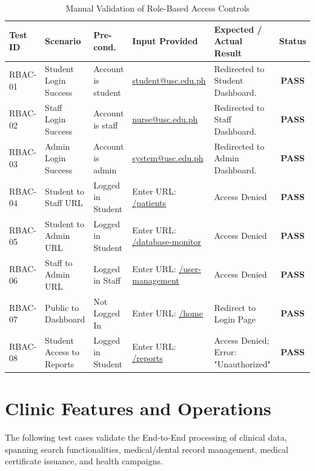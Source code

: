 \begin{table}[H]
\centering
\caption{Manual Validation of Role-Based Access Controls}
\begin{tabularx}{\textwidth}{|l|Y|Y|Y|Y|c|}
\hline
\textbf{Test ID} & \textbf{Scenario} & \textbf{Pre-cond.} & \textbf{Input Provided} & \textbf{Expected / Actual Result} & \textbf{Status} \\
\hline
RBAC-01 & Student Login Success & Account is student & \url{student@usc.edu.ph} & Redirected to Student Dashboard. & \textbf{PASS} \\
\hline
RBAC-02 & Staff Login Success & Account is staff & \url{nurse@usc.edu.ph} & Redirected to Staff Dashboard. & \textbf{PASS} \\
\hline
RBAC-03 & Admin Login Success & Account is admin & \url{system@usc.edu.ph} & Redirected to Admin Dashboard. & \textbf{PASS} \\
\hline
RBAC-04 & Student to Staff URL & Logged in Student & Enter URL: \url{/patients} & Access Denied & \textbf{PASS} \\
\hline
RBAC-05 & Student to Admin URL & Logged in Student & Enter URL: \url{/database-monitor} & Access Denied & \textbf{PASS} \\
\hline
RBAC-06 & Staff to Admin URL & Logged in Staff & Enter URL: \url{/user-management} & Access Denied & \textbf{PASS} \\
\hline
RBAC-07 & Public to Dashboard & Not Logged In & Enter URL: \url{/home} & Redirect to Login Page & \textbf{PASS} \\
\hline
RBAC-08 & Student Access to Reports & Logged in Student & Enter URL: \url{/reports} & Access Denied; Error: "Unauthorized" & \textbf{PASS} \\
\hline
\end{tabularx}
\end{table}

\section{Clinic Features and Operations}
The following test cases validate the End-to-End processing of clinical data, spanning search functionalities, medical/dental record management, medical certificate issuance, and health campaigns.

